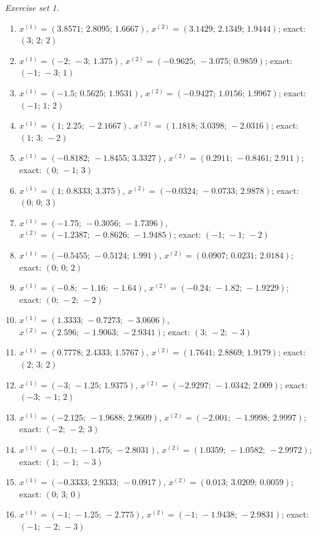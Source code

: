 \par\noindent\emph{Exercise set 1.}\nopagebreak
\begin{enumerate}[label=\arabic*., leftmargin=*, itemsep=1pt]
\item $x^{(1)}=(3.8571;\,2.8095;\,1.6667)$, $x^{(2)}=(3.1429;\,2.1349;\,1.9444)$; exact: $(3;\,2;\,2)$
\item $x^{(1)}=(-2;\,-3;\,1.375)$, $x^{(2)}=(-0.9625;\,-3.075;\,0.9859)$; exact: $(-1;\,-3;\,1)$
\item $x^{(1)}=(-1.5;\,0.5625;\,1.9531)$, $x^{(2)}=(-0.9427;\,1.0156;\,1.9967)$; exact: $(-1;\,1;\,2)$
\item $x^{(1)}=(1;\,2.25;\,-2.1667)$, $x^{(2)}=(1.1818;\,3.0398;\,-2.0316)$; exact: $(1;\,3;\,-2)$
\item $x^{(1)}=(-0.8182;\,-1.8455;\,3.3327)$, $x^{(2)}=(0.2911;\,-0.8461;\,2.911)$; exact: $(0;\,-1;\,3)$
\item $x^{(1)}=(1;\,0.8333;\,3.375)$, $x^{(2)}=(-0.0324;\,-0.0733;\,2.9878)$; exact: $(0;\,0;\,3)$
\item $x^{(1)}=(-1.75;\,-0.3056;\,-1.7396)$, $x^{(2)}=(-1.2387;\,-0.8626;\,-1.9485)$; exact: $(-1;\,-1;\,-2)$
\item $x^{(1)}=(-0.5455;\,-0.5124;\,1.991)$, $x^{(2)}=(0.0907;\,0.0231;\,2.0184)$; exact: $(0;\,0;\,2)$
\item $x^{(1)}=(-0.8;\,-1.16;\,-1.64)$, $x^{(2)}=(-0.24;\,-1.82;\,-1.9229)$; exact: $(0;\,-2;\,-2)$
\item $x^{(1)}=(1.3333;\,-0.7273;\,-3.0606)$, $x^{(2)}=(2.596;\,-1.9063;\,-2.9341)$; exact: $(3;\,-2;\,-3)$
\item $x^{(1)}=(0.7778;\,2.4333;\,1.5767)$, $x^{(2)}=(1.7641;\,2.8869;\,1.9179)$; exact: $(2;\,3;\,2)$
\item $x^{(1)}=(-3;\,-1.25;\,1.9375)$, $x^{(2)}=(-2.9297;\,-1.0342;\,2.009)$; exact: $(-3;\,-1;\,2)$
\item $x^{(1)}=(-2.125;\,-1.9688;\,2.9609)$, $x^{(2)}=(-2.001;\,-1.9998;\,2.9997)$; exact: $(-2;\,-2;\,3)$
\item $x^{(1)}=(-0.1;\,-1.475;\,-2.8031)$, $x^{(2)}=(1.0359;\,-1.0582;\,-2.9972)$; exact: $(1;\,-1;\,-3)$
\item $x^{(1)}=(-0.3333;\,2.9333;\,-0.0917)$, $x^{(2)}=(0.013;\,3.0209;\,0.0059)$; exact: $(0;\,3;\,0)$
\item $x^{(1)}=(-1;\,-1.25;\,-2.775)$, $x^{(2)}=(-1;\,-1.9438;\,-2.9831)$; exact: $(-1;\,-2;\,-3)$

\end{enumerate}
